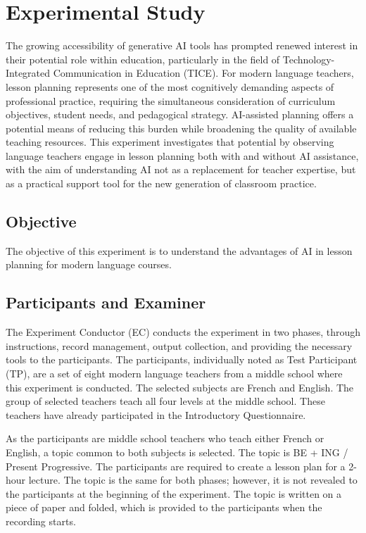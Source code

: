 \chapter{Experimental Study}

The growing accessibility of generative AI tools has prompted renewed interest in their potential role within education, particularly in the field of Technology-Integrated Communication in Education (TICE). For modern language teachers, lesson planning represents one of the most cognitively demanding aspects of professional practice, requiring the simultaneous consideration of curriculum objectives, student needs, and pedagogical strategy. AI-assisted planning offers a potential means of reducing this burden while broadening the quality of available teaching resources.\cite{ref:gitwiki} This experiment investigates that potential by observing language teachers engage in lesson planning both with and without AI assistance, with the aim of understanding AI not as a replacement for teacher expertise, but as a practical support tool for the new generation of classroom practice.

\section{Objective}

The objective of this experiment is to understand the advantages of AI in lesson planning for modern language courses. 

\section{Participants and Examiner}

The Experiment Conductor (EC) conducts the experiment in two phases, through instructions, record management, output collection, and providing the necessary tools to the participants.
The participants, individually noted as Test Participant (TP), are a set of eight modern language teachers from a middle school where this experiment is conducted. The selected subjects are French and English. The group of selected teachers teach all four levels at the middle school. These teachers have already participated in the Introductory Questionnaire.

\vspace{5mm}

\noindent As the participants are middle school teachers who teach either French or English, a topic common to both subjects is selected. The topic is BE + ING / Present Progressive. The participants are required to create a lesson plan for a 2-hour lecture. The topic is the same for both phases; however, it is not revealed to the participants at the beginning of the experiment. The topic is written on a piece of paper and folded, which is provided to the participants when the recording starts.

